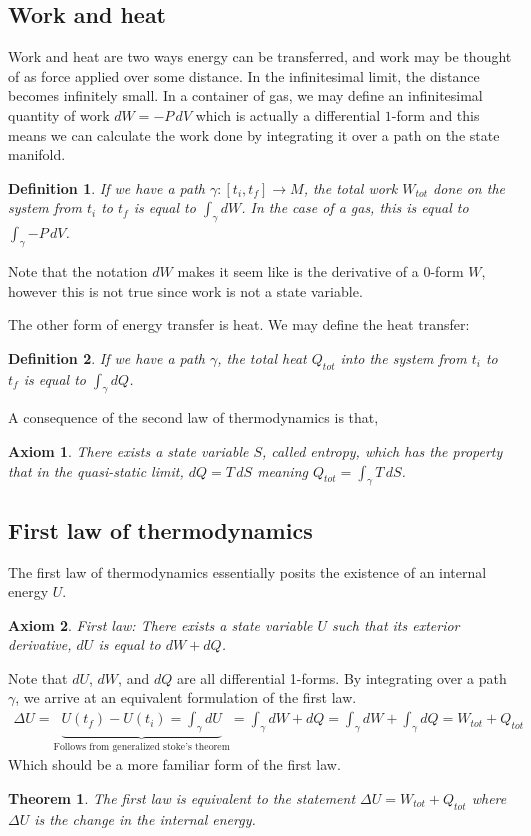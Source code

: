 \documentclass[12pt]{article}
\newtheorem{definition}{Definition}
\newtheorem{axiom}{Axiom}
\newtheorem{theorem}{Theorem}
\begin{document}
\subsection{Work and heat}
Work and heat are two ways energy can be transferred, and work may be thought of as force applied over some distance. In the infinitesimal limit, the distance becomes infinitely small. In a container of gas, we may define an infinitesimal quantity of work $dW = -P\, dV$ which is actually a differential $1$-form and this means we can calculate the work done by integrating it over a path on the state manifold.
\begin{definition}
If we have a path $\gamma: [t_i, t_f] \to M$, the total work $W_{tot}$ done on the system from $t_i$ to $t_f$ is equal to $\int_{\gamma}{dW}$. In the case of a gas, this is equal to $\int_{\gamma}{-P\, dV}$.
\end{definition}Note that the notation $dW$ makes it seem like is the derivative of a $0$-form $W$, however this is not true since work is not a state variable.\par
The other form of energy transfer is heat. We may define the heat transfer:
\begin{definition}
If we have a path $\gamma$, the total heat $Q_{tot}$ into the system from $t_i$ to $t_f$ is equal to $\int_{\gamma}{dQ}$.
\end{definition}
A consequence of the second law of thermodynamics is that,
\begin{axiom}
There exists a state variable $S$, called entropy, which has the property that in the quasi-static limit, $dQ = T\, dS$ meaning $Q_{tot} = \int_{\gamma}{T\, dS}$.
\end{axiom}

\subsection{First law of thermodynamics}
The first law of thermodynamics essentially posits the existence of an internal energy $U$.
\begin{axiom}
First law: There exists a state variable $U$ such that its exterior derivative, $dU$ is equal to $dW + dQ$.
\end{axiom}
Note that $dU$, $dW$, and $dQ$ are all differential 1-forms. By integrating over a path $\gamma$, we arrive at an equivalent formulation of the first law.
\begin{gather}
    \Delta U = \underbrace{U(t_f) - U(t_i) = \int_{\gamma}{dU}}_{\text{Follows from generalized stoke's theorem}} = \int_{\gamma}{dW + dQ} = \int_{\gamma}{dW} + \int_{\gamma}{dQ} = W_{tot} + Q_{tot}
\end{gather}
Which should be a more familiar form of the first law.
\begin{theorem}
The first law is equivalent to the statement $\Delta U = W_{tot} + Q_{tot}$ where $\Delta U$ is the change in the internal energy.
\end{theorem}
\end{document}
